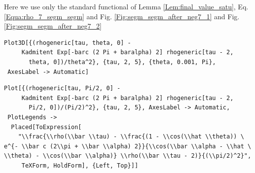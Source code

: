 \documentclass[reqno]{amsart}
\theoremstyle{definition} \newtheorem{definition}{Definition}[section]
\theoremstyle{definition} \newtheorem{remark}[definition]{Remark}
\theoremstyle{plain} \newtheorem{lemma}[definition]{Lemma}
\theoremstyle{plain} \newtheorem{proposition}[definition]{Proposition}
\theoremstyle{plain} \newtheorem{theorem}[definition]{Theorem}
\theoremstyle{plain} \newtheorem{corollary}[definition]{Corollary}
\theoremstyle{definition} \newtheorem{example}[definition]{Example}
\theoremstyle{plain} \newtheorem{claim}[clai]{Claim}
\theoremstyle{definition} \newtheorem{assumption}[definition]{Assumption}
\theoremstyle{definition} \newtheorem{observation}[definition]{Observation}
\newcommand{\1}{\mathbbm 1}
\newcommand{\smed}{\medskip}
\newcommand{\sbig}{\bigskip}
\numberwithin{equation}{section} %
\theoremstyle{plain} \newtheorem*{theorem*}{Theorem}
\theoremstyle{plain} \newtheorem{mthm}[maintheorem]{Main Theorem}
\theoremstyle{plain} \newtheorem*{mthm*}{Main Theorem}
\theoremstyle{plain} \newtheorem*{conjecture*}{Conjecture}
\theoremstyle{plain} \newtheorem{conjecture}[definition]{Conjecture}
\theoremstyle{plain} \newtheorem*{problem*}{Problem}
\begin{document}
\noindent Here we use only the standard functional of Lemma \ref{Lem:final_value_satu}, Eq. \eqref{Equa:rho_7_segm_segm} and Fig. \ref{Fig:segm_segm_after_neg7_1} and Fig. \ref{Fig:segm_segm_after_neg7_2}
\smed
\begin{verbatim}
Plot3D[{(rhogeneric[tau, theta, 0] - 
     Kadmitent Exp[-barc (2 Pi + baralpha) 2] rhogeneric[tau - 2, 
       theta, 0])/theta^2}, {tau, 2, 5}, {theta, 0.001, Pi}, 
 AxesLabel -> Automatic]
\end{verbatim}
\begin{verbatim}
Plot[{(rhogeneric[tau, Pi/2, 0] - 
     Kadmitent Exp[-barc (2 Pi + baralpha) 2] rhogeneric[tau - 2, 
       Pi/2, 0])/(Pi/2)^2}, {tau, 2, 5}, AxesLabel -> Automatic, 
 PlotLegends -> 
  Placed[ToExpression[
    "\\frac{\\rho(\\bar \\tau) - \\frac{(1 - \\cos(\\hat \\theta)) \
e^{- \\bar c (2\\pi + \\bar \\alpha) 2}}{\\cos(\\bar \\alpha - \\hat \
\\theta) - \\cos(\\bar \\alpha)} \\rho(\\bar \\tau - 2)}{(\\pi/2)^2}",
     TeXForm, HoldForm], {Left, Top}]]
\end{verbatim}

\sbig


\sbig


\sbig
\end{document}

